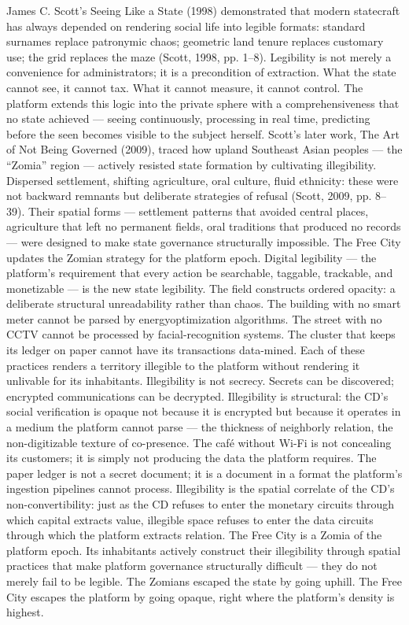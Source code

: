 James C. Scott’s Seeing Like a State (1998) demonstrated that modern statecraft has always depended on rendering social life into legible formats: standard surnames replace patronymic chaos; geometric land tenure replaces customary use; the grid replaces the maze (Scott, 1998, pp. 1–8). Legibility is not merely a convenience for administrators; it is a precondition of extraction. What the state cannot see, it cannot tax. What it cannot measure, it cannot control. The platform extends this logic into the private sphere with a comprehensiveness that no state achieved — seeing continuously, processing in real time, predicting before the seen becomes visible to the subject herself. Scott’s later work, The Art of Not Being Governed (2009), traced how upland Southeast Asian peoples — the “Zomia” region — actively resisted state formation by cultivating illegibility. Dispersed settlement, shifting agriculture, oral culture, fluid ethnicity: these were not backward remnants but deliberate strategies of refusal (Scott, 2009, pp. 8–39). Their spatial forms — settlement patterns that avoided central places, agriculture that left no permanent fields, oral traditions that produced no records — were designed to make state governance structurally impossible. The Free City updates the Zomian strategy for the platform epoch. Digital legibility — the platform’s requirement that every action be searchable, taggable, trackable, and monetizable — is the new state legibility. The field constructs ordered opacity: a deliberate structural unreadability rather than chaos. The building with no smart meter cannot be parsed by energyoptimization algorithms. The street with no CCTV cannot be processed by facial-recognition systems. The cluster that keeps its ledger on paper cannot have its transactions data-mined. Each of these practices renders a territory illegible to the platform without rendering it unlivable for its inhabitants. Illegibility is not secrecy. Secrets can be discovered; encrypted communications can be decrypted. Illegibility is structural: the CD’s social verification is opaque not because it is encrypted but because it operates in a medium the platform cannot parse — the thickness of neighborly relation, the non-digitizable texture of co-presence. The café without Wi-Fi is not concealing its customers; it is simply not producing the data the platform requires. The paper ledger is not a secret document; it is a document in a format the platform’s ingestion pipelines cannot process. Illegibility is the spatial correlate of the CD’s non-convertibility: just as the CD refuses to enter the monetary circuits through which capital extracts value, illegible space refuses to enter the data circuits through which the platform extracts relation. The Free City is a Zomia of the platform epoch. Its inhabitants actively construct their illegibility through spatial practices that make platform governance structurally difficult — they do not merely fail to be legible. The Zomians escaped the state by going uphill. The Free City escapes the platform by going opaque, right where the platform’s density is highest.

